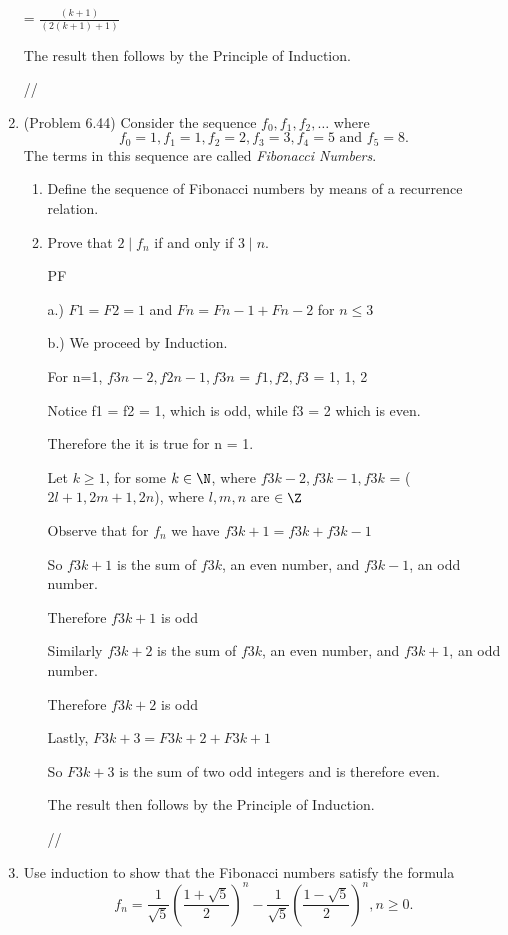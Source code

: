 \documentclass[12pt]{article}
\begin{document}
\begin{enumerate}
{= $\frac{(k+1)}{(2(k+1)+1)}$

The result then follows by the Principle of Induction.

//

}





\item (Problem 6.44) Consider the sequence $f_0, f_1, f_2, \hdots$ where 
$$f_0 = 1, f_1 = 1, f_2 = 2, f_3 = 3, f_4 = 5 \text{ and } f_5 = 8.$$
The terms in this sequence are called \emph{Fibonacci Numbers}.
\begin{enumerate}
\item Define the sequence of Fibonacci numbers by means of a recurrence relation.
\item Prove that $2 \mid f_n$ if and only if $3 \mid n$.

{PF

a.)  $F1 = F2 = 1$ and $Fn = Fn -1 + Fn - 2$ for $n \leq 3$

b.) We proceed by Induction. 

For n=1, $f3n-2 , f2n-1 , f3n$ = $f1, f2, f3$ = 1, 1, 2

Notice f1 = f2 = 1, which is odd, while f3 = 2 which is even.

Therefore the it is true for n = 1.

Let $k \geq 1$, for some $k \in \N$, where $f3k-2 , f3k-1 , f3k$ = ($2l+1, 2m+1, 2n$), where $l,m,n$ are $\in \Z$

Observe that for $f_n$ we have $f3k+1= f3k + f3k-1$ 

So $f3k+1$ is the sum of $f3k$, an even number, and $f3k-1$, an odd number.

Therefore $f3k+1$ is odd

Similarly $f3k+2$ is the sum of $f3k$, an even number, and $f3k+1$, an odd number.

Therefore $f3k+2$ is odd

Lastly, $F3k+3 = F3k+2 + F3k+1$

So $F3k+3$ is the sum of two odd integers and is therefore even.

The result then follows by the Principle of Induction.

//
}



\end{enumerate}

\item Use induction to show that the Fibonacci numbers satisfy the formula
$$f_n = \frac{1}{\sqrt{5}} \left( \frac{1 + \sqrt{5}}{2} \right)^n - \frac{1}{\sqrt{5}} \left( \frac{1 - \sqrt{5}}{2} \right)^n, n \geq 0.$$


\end{enumerate}
\end{document}
